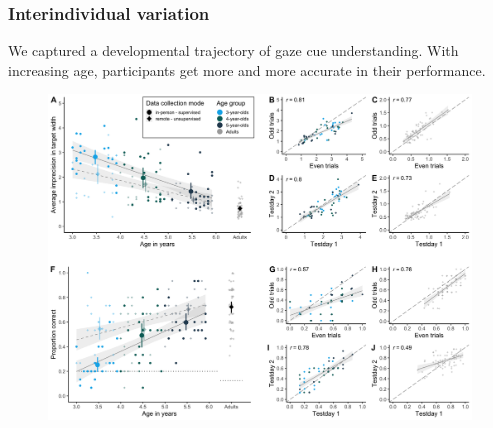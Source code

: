 \documentclass[
  man,floatsintext]{apa6}
\begin{document}
\hypertarget{interindividual-variation}{%
\subsubsection{Interindividual variation}\label{interindividual-variation}}

We captured a developmental trajectory of gaze cue understanding. With increasing age, participants get more and more accurate in their performance.










\begin{figure}

{\centering \includegraphics[width=1\linewidth]{../figures/gafo_results} 

}


\end{figure}
\end{document}

